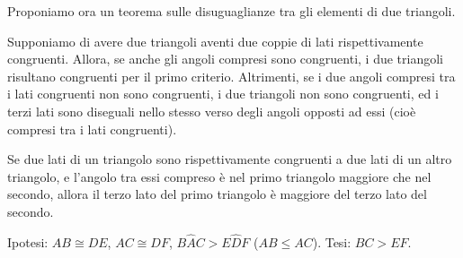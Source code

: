 Proponiamo ora un teorema sulle disuguaglianze tra gli elementi di 
due triangoli.

Supponiamo di avere due triangoli aventi due coppie di lati 
rispettivamente congruenti. Allora, se anche gli angoli compresi sono 
congruenti, i due triangoli risultano congruenti per il primo 
criterio. Altrimenti, se i due angoli compresi tra i lati congruenti 
non sono congruenti, i due triangoli non sono congruenti, ed i terzi 
lati sono diseguali nello stesso verso degli angoli opposti ad essi 
(cioè compresi tra i lati congruenti).

\begin{teorema}
Se due lati di un triangolo sono rispettivamente congruenti a due 
lati di un altro triangolo, e l'angolo tra essi compreso è nel primo 
triangolo maggiore che nel secondo, allora il terzo lato del primo 
triangolo è maggiore del terzo lato del secondo.
\end{teorema}

\noindent Ipotesi: \(AB\cong DE\), \(AC\cong DF\), 
\(B\widehat{A}C>E\widehat{D}F\) (\(AB\leq AC\)). Tesi: \(BC>EF\).


\begin{inaccessibleblock}
 \begin{figure}[htb]
\centering
\end{figure}
\end{inaccessibleblock}

